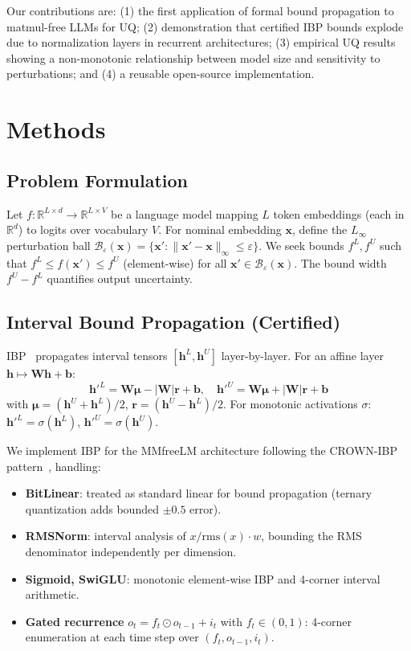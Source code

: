 \documentclass[11pt]{article}
\begin{document}
Our contributions are: (1) the first application of formal bound propagation to matmul-free LLMs for UQ; (2) demonstration that certified IBP bounds explode due to normalization layers in recurrent architectures; (3) empirical UQ results showing a non-monotonic relationship between model size and sensitivity to perturbations; and (4) a reusable open-source implementation.

\section{Methods}

\subsection{Problem Formulation}

Let $f: \mathbb{R}^{L \times d} \to \mathbb{R}^{L \times V}$ be a language model mapping $L$ token embeddings (each in $\mathbb{R}^d$) to logits over vocabulary $V$. For nominal embedding $\mathbf{x}$, define the $L_\infty$ perturbation ball $\mathcal{B}_\varepsilon(\mathbf{x}) = \{\mathbf{x}' : \|\mathbf{x}' - \mathbf{x}\|_\infty \leq \varepsilon\}$. We seek bounds $f^L, f^U$ such that $f^L \leq f(\mathbf{x}') \leq f^U$ (element-wise) for all $\mathbf{x}' \in \mathcal{B}_\varepsilon(\mathbf{x})$. The bound width $f^U - f^L$ quantifies output uncertainty.

\subsection{Interval Bound Propagation (Certified)}

IBP~\cite{gowal2018} propagates interval tensors $[\mathbf{h}^L, \mathbf{h}^U]$ layer-by-layer. For an affine layer $\mathbf{h} \mapsto \mathbf{W}\mathbf{h} + \mathbf{b}$:
\begin{equation}
\mathbf{h}'^L = \mathbf{W}\boldsymbol{\mu} - |\mathbf{W}|\mathbf{r} + \mathbf{b}, \quad
\mathbf{h}'^U = \mathbf{W}\boldsymbol{\mu} + |\mathbf{W}|\mathbf{r} + \mathbf{b}
\end{equation}
with $\boldsymbol{\mu} = (\mathbf{h}^U + \mathbf{h}^L)/2$, $\mathbf{r} = (\mathbf{h}^U - \mathbf{h}^L)/2$.
For monotonic activations $\sigma$: $\mathbf{h}'^L = \sigma(\mathbf{h}^L)$, $\mathbf{h}'^U = \sigma(\mathbf{h}^U)$.

We implement IBP for the MMfreeLM architecture following the CROWN-IBP pattern~\cite{zhang2020}, handling:
\begin{itemize}[nosep]
    \item \textbf{BitLinear}: treated as standard linear for bound propagation (ternary quantization adds bounded $\pm 0.5$ error).
    \item \textbf{RMSNorm}: interval analysis of $x/\text{rms}(x)\cdot w$, bounding the RMS denominator independently per dimension.
    \item \textbf{Sigmoid, SwiGLU}: monotonic element-wise IBP and 4-corner interval arithmetic.
    \item \textbf{Gated recurrence} $o_t = f_t \odot o_{t-1} + i_t$ with $f_t \in (0,1)$: 4-corner enumeration at each time step over $(f_t, o_{t-1}, i_t)$.
\end{itemize}
\end{document}
